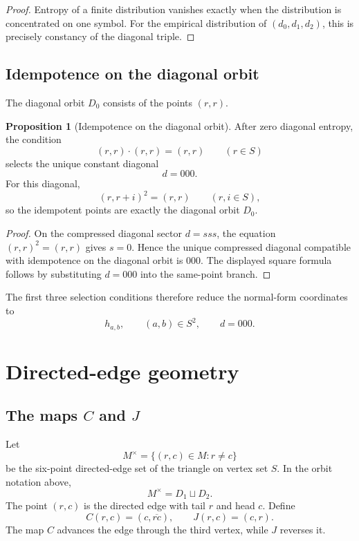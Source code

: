 \documentclass[11pt]{article}
\theoremstyle{definition}
\newtheorem{proposition}[theorem]{Proposition}
\begin{document}
\begin{proof}
Entropy of a finite distribution vanishes exactly when the distribution is
concentrated on one symbol.  For the empirical distribution of
\((d_0,d_1,d_2)\), this is precisely constancy of the diagonal triple.
\end{proof}

\subsection{Idempotence on the diagonal orbit}\label{diagonal-orbit-idempotence}

The diagonal orbit \(D_0\) consists of the points \((r,r)\).

\begin{proposition}[Idempotence on the diagonal orbit]
\label{prop:10.2}
After zero diagonal entropy, the condition
\[
(r,r)\cdot(r,r)=(r,r)
\qquad(r\in S)
\]
selects the unique constant diagonal
\[
d=000.
\]
For this diagonal,
\[
(r,r+i)^2=(r,r)
\qquad(r,i\in S),
\]
so the idempotent points are exactly the diagonal orbit \(D_0\).
\end{proposition}

\begin{proof}
On the compressed diagonal sector \(d=sss\), the equation
\((r,r)^2=(r,r)\) gives \(s=0\).  Hence the unique compressed diagonal
compatible with idempotence on the diagonal orbit is \(000\).  The displayed square formula
follows by substituting \(d=000\) into the same-point branch.
\end{proof}

The first three selection conditions therefore reduce the normal-form
coordinates to
\[
h_{a,b},
\qquad
(a,b)\in S^2,
\qquad
 d=000.
\]

\section{Directed-edge geometry}\label{directed-edge-geometry}

\subsection[The maps C and J]{The maps \(C\) and \(J\)}\label{maps-c-j}

Let
\[
M^\times=\{(r,c)\in M:r\ne c\}
\]
be the six-point directed-edge set of the triangle on vertex set \(S\).  In the
orbit notation above,
\[
M^\times=D_1\sqcup D_2.
\]
The point \((r,c)\) is the directed edge with tail \(r\) and head \(c\).  Define
\[
C(r,c)=(c,\overline{rc}),
\qquad
J(r,c)=(c,r).
\]
The map \(C\) advances the edge through the third vertex, while \(J\) reverses
it.
\end{document}
